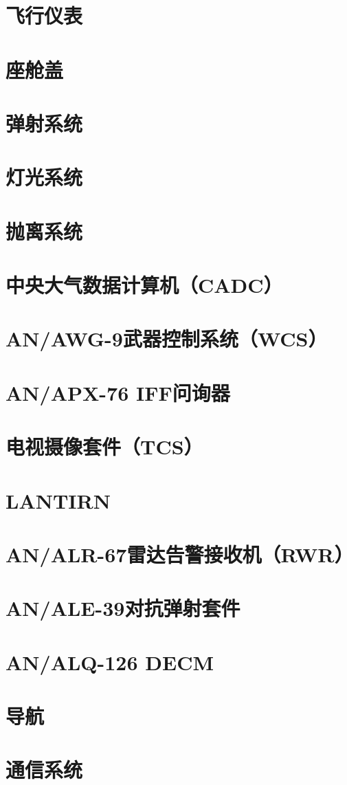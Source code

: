 \section{飞行仪表}

\section{座舱盖}

\section{弹射系统}

\section{灯光系统}

\section{抛离系统}

\section{中央大气数据计算机（CADC）}

\section{AN/AWG-9武器控制系统（WCS）}

\section{AN/APX-76 IFF问询器}

\section{电视摄像套件（TCS）}

\section{LANTIRN}

\section{AN/ALR-67雷达告警接收机（RWR）}

\section{AN/ALE-39对抗弹射套件}

\section{AN/ALQ-126 DECM}

\section{导航}

\section{通信系统}

